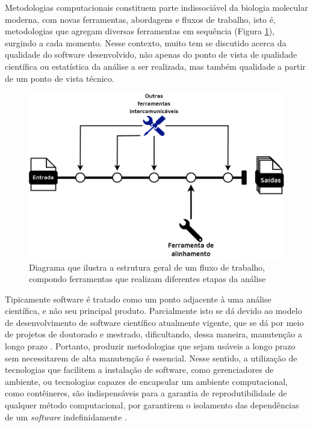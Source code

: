 \documentclass[
	12pt,				%
	oneside,			%
	a4paper,			%
	chapter=TITLE,		%
	section=TITLE,		%
	english,			%
	brazil				%
	]{abntex2}
\begin{document}
Metodologias computacionais constituem parte indissociável da biologia molecular moderna, com novas ferramentas, abordagens e fluxos de trabalho, isto é, metodologias que agregam diversas ferramentas em sequência (Figura \ref{fig:workflow}), surgindo a cada momento. Nesse contexto, muito tem se discutido acerca da qualidade do software desenvolvido, não apenas do ponto de vista de qualidade científica ou estatística da análise a ser realizada, mas também qualidade a partir de um ponto de vista técnico.
\begin{figure}[H]

{\centering \includegraphics[width=0.7\linewidth]{figure/fluxo_de_trabalho} 

}

\caption{Diagrama que ilustra a estrutura geral de um fluxo de trabalho, compondo ferramentas que realizam diferentes etapas da análise}\label{fig:workflow}
\end{figure}
Tipicamente software é tratado como um ponto adjacente à uma análise científica, e não seu principal produto. Parcialmente isto se dá devido ao modelo de desenvolvimento de software científico atualmente vigente, que se dá por meio de projetos de doutorado e mestrado, dificultando, dessa maneira, manutenção a longo prazo \autocite{altschul2013} \autocite{mangul2019a}. Portanto, produzir metodologias que sejam usáveis a longo prazo sem necessitarem de alta manutenção é essencial. Nesse sentido, a utilização de tecnologias que facilitem a instalação de software, como gerenciadores de ambiente, ou tecnologias capazes de encapsular um ambiente computacional, como contêineres, são indispensáveis para a garantia de reprodutibilidade de qualquer método computacional, por garantirem o isolamento das dependências de um \emph{software} indefinidamente \autocite{kadri2022}.
\end{document}
